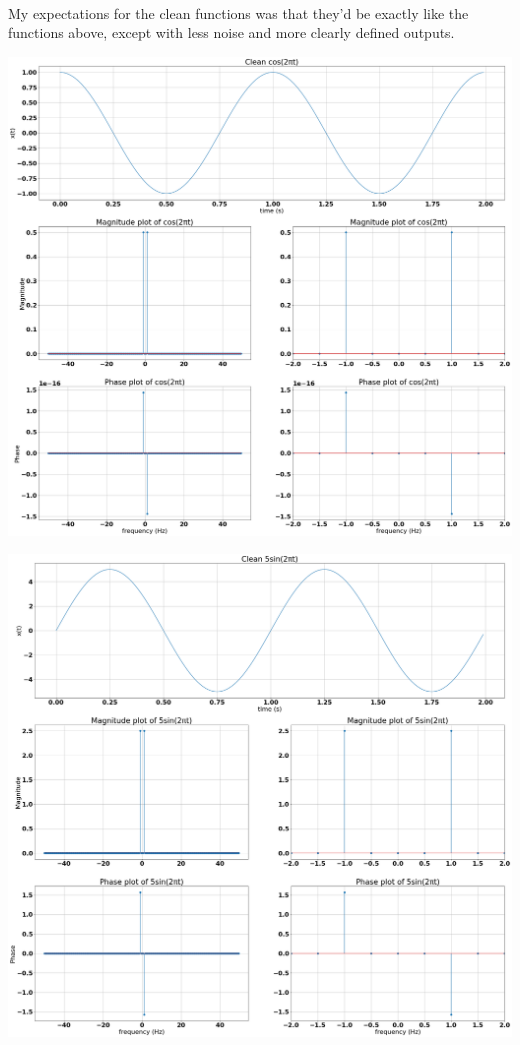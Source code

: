 \documentclass[12pt]{report}
\begin{document}
    \paragraph{} My expectations for the clean functions was that they'd be exactly like the functions above, except with less noise and more clearly defined outputs. 
    
    \includegraphics[scale=0.25]{Figure 2022-03-22 205111 (3).png}
    
    \includegraphics[scale=0.25]{Figure 2022-03-22 205111 (4).png}
    
\end{document}
